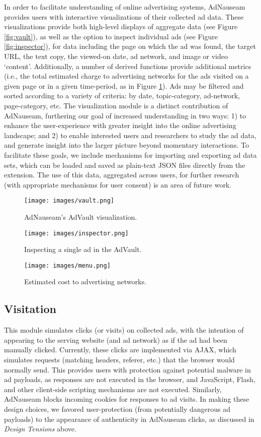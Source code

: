 \documentclass[conference]{IEEEtran}
\begin{document}
In order to facilitate understanding of online advertising systems, AdNauseam provides users with interactive visualizations of their collected ad data. These visualizations provide both high-level displays of aggregate data (see Figure \ref{fig:vault}), as well as the option to inspect individual ads (see Figure \ref{fig:inspector}), for data  including the page on which the ad was found, the target URL, the text copy, the viewed-on date, ad network, and image or video ‘content’. Additionally, a number of derived functions provide additional metrics (i.e., the total estimated charge to advertising networks for the ads visited on a given page or in a given time-period, as in Figure \ref{fig:menu}). Ads may be filtered and sorted according to a variety of criteria: by date, topic-category, ad-network, page-category, etc. The visualization module is a distinct contribution of AdNauseam, furthering our goal of increased understanding in two ways: 1) to enhance the user-experience with greater insight into the online advertising landscape; and 2) to enable interested users and researchers to study the ad data, and generate insight into the larger picture beyond momentary interactions. To facilitate these goals, we include mechanisms for importing and exporting ad data sets, which can be loaded and saved as plain-text JSON files directly from the extension. The use of this data, aggregated across users, for further research (with appropriate mechanisms for user consent) is an area of future work.

\begin{figure}[!t]
\centering
\texttt{[image: images/vault.png]}
\caption{AdNauseam's AdVault visualization.}
\label{fig:vault}
\vspace{2mm}
\texttt{[image: images/inspector.png]}
\caption{Inspecting a single ad in the AdVault.}
\label{fig:inspector}
\vspace{2mm}
\texttt{[image: images/menu.png]}
\caption{Estimated cost to advertising networks.}
\label{fig:menu}
\end{figure}


\subsection{Visitation}

This module simulates clicks (or visits) on collected ads, with the intention of appearing to the serving website (and ad network) as if the ad had been manually clicked. Currently, these clicks are implemented via AJAX, which simulates requests (matching headers, referer, etc.) that the browser would normally send. This provides users with protection against potential malware in ad payloads, as responses are not executed in the browser, and JavaScript, Flash, and other client-side scripting mechanisms are not executed. Similarly, AdNauseam blocks incoming cookies for responses to ad visits. In making these design choices, we favored user-protection (from potentially dangerous ad payloads) to the appearance of authenticity in AdNauseam clicks, as discussed in \emph{Design Tensions} above.
\end{document}
